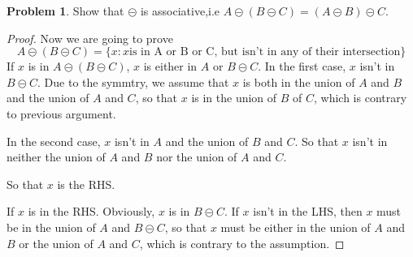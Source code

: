 \documentclass[a4paper,11pt]{article}%
\theoremstyle{remark}
\theoremstyle{definition}
\newtheorem{problem}{Problem}[subsection]
\begin{document}
\begin{problem}
    Show that $\circleddash$ is associative,i.e $A\circleddash(B\circleddash C)=(A\circleddash B)\circleddash C$.
    \begin{proof}
Now we are going to prove
\[A\circleddash (B\circleddash C)=\{x:x \text{is in A or B or C, but isn't in any of their intersection}\}\]
    If $x$ is in $A\circleddash(B\circleddash C)$, $x$ is either in $A$ or $B\circleddash C$.
    In the first case, $x$ isn't in $B\circleddash C$. Due to the symmtry, we assume that 
    $x$ is both in the union of $A$ and $B$ and the union of $A$ and $C$, so that $x$ is in the union
    of $B$ of $C$, which is contrary to previous argument.
    
    In the second case, $x$ isn't in $A$ and the union of $B$ and $C$. So that $x$ isn't in neither the
    union of $A$ and $B$ nor the union of $A$ and $C$.

    So that $x$ is the RHS.

    If $x$ is in the RHS.
    Obviously, $x$ is in $B\circleddash C$.
    If $x$ isn't in the LHS, then $x$ must be in the union of $A$ and $B\circleddash C$,
    so that $x$ must be either in the union of $A$ and $B$ or the union of $A$ and $C$, which is
    contrary to the assumption.


\end{proof}
\end{problem}
\end{document}

